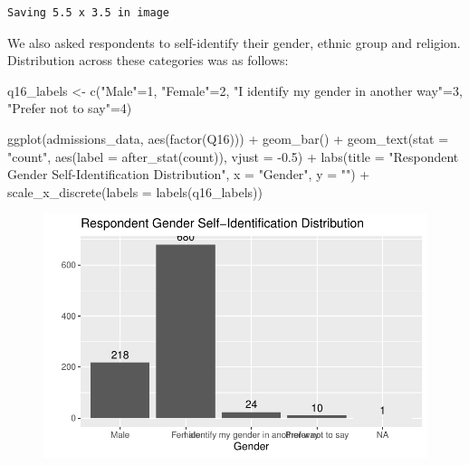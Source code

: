 \documentclass[
  letterpaper,
  DIV=11,
  numbers=noendperiod]{scrartcl}
\newenvironment{Shaded}{\begin{snugshade}}{\end{snugshade}}
\newcommand{\AttributeTok}[1]{\textcolor[rgb]{0.40,0.45,0.13}{#1}}
\newcommand{\DecValTok}[1]{\textcolor[rgb]{0.68,0.00,0.00}{#1}}
\newcommand{\FloatTok}[1]{\textcolor[rgb]{0.68,0.00,0.00}{#1}}
\newcommand{\FunctionTok}[1]{\textcolor[rgb]{0.28,0.35,0.67}{#1}}
\newcommand{\NormalTok}[1]{\textcolor[rgb]{0.00,0.23,0.31}{#1}}
\newcommand{\OtherTok}[1]{\textcolor[rgb]{0.00,0.23,0.31}{#1}}
\newcommand{\SpecialCharTok}[1]{\textcolor[rgb]{0.37,0.37,0.37}{#1}}
\newcommand{\StringTok}[1]{\textcolor[rgb]{0.13,0.47,0.30}{#1}}
\begin{document}
\begin{verbatim}
Saving 5.5 x 3.5 in image
\end{verbatim}

We also asked respondents to self-identify their gender, ethnic group
and religion. Distribution across these categories was as follows:

\begin{Shaded}
\begin{Highlighting}[]
\NormalTok{q16\_labels }\OtherTok{\textless{}{-}} \FunctionTok{c}\NormalTok{(}\StringTok{"Male"}\OtherTok{=}\DecValTok{1}\NormalTok{, }\StringTok{"Female"}\OtherTok{=}\DecValTok{2}\NormalTok{, }\StringTok{"I identify my gender in another way"}\OtherTok{=}\DecValTok{3}\NormalTok{, }\StringTok{"Prefer not to say"}\OtherTok{=}\DecValTok{4}\NormalTok{)}

\FunctionTok{ggplot}\NormalTok{(admissions\_data, }\FunctionTok{aes}\NormalTok{(}\FunctionTok{factor}\NormalTok{(Q16))) }\SpecialCharTok{+} 
  \FunctionTok{geom\_bar}\NormalTok{() }\SpecialCharTok{+}
  \FunctionTok{geom\_text}\NormalTok{(}\AttributeTok{stat =} \StringTok{"count"}\NormalTok{, }\FunctionTok{aes}\NormalTok{(}\AttributeTok{label =} \FunctionTok{after\_stat}\NormalTok{(count)), }\AttributeTok{vjust =} \SpecialCharTok{{-}}\FloatTok{0.5}\NormalTok{) }\SpecialCharTok{+}
  \FunctionTok{labs}\NormalTok{(}\AttributeTok{title =} \StringTok{"Respondent Gender Self{-}Identification Distribution"}\NormalTok{, }\AttributeTok{x =} \StringTok{"Gender"}\NormalTok{, }\AttributeTok{y =} \StringTok{""}\NormalTok{) }\SpecialCharTok{+} \FunctionTok{scale\_x\_discrete}\NormalTok{(}\AttributeTok{labels =} \FunctionTok{labels}\NormalTok{(q16\_labels))}
\end{Highlighting}
\end{Shaded}

\begin{figure}[H]

{\centering \includegraphics{final_draft_files/figure-pdf/gender-1.pdf}

}

\end{figure}
\end{document}
